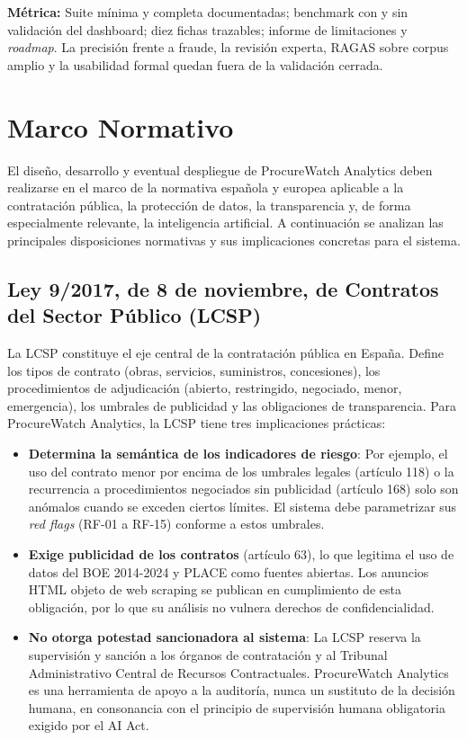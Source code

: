\documentclass[11pt,a4paper,spanish]{book}
\numberwithin{equation}{chapter}
\numberwithin{figure}{chapter}
\begin{document}
\textbf{M{\'e}trica:} Suite m{\'i}nima y completa documentadas; benchmark con y sin validaci{\'o}n del dashboard; diez fichas trazables; informe de limitaciones y \textit{roadmap}. La precisi{\'o}n frente a fraude, la revisi{\'o}n experta, RAGAS sobre corpus amplio y la usabilidad formal quedan fuera de la validaci{\'o}n cerrada.

\chapter{Marco Normativo}

El diseño, desarrollo y eventual despliegue de ProcureWatch Analytics deben realizarse en el marco de la normativa española y europea aplicable a la contratación pública, la protección de datos, la transparencia y, de forma especialmente relevante, la inteligencia artificial. A continuación se analizan las principales disposiciones normativas y sus implicaciones concretas para el sistema.

\section{Ley 9/2017, de 8 de noviembre, de Contratos del Sector Público (LCSP)}

La LCSP \cite{LCSP2017} constituye el eje central de la contratación pública en España. Define los tipos de contrato (obras, servicios, suministros, concesiones), los procedimientos de adjudicación (abierto, restringido, negociado, menor, emergencia), los umbrales de publicidad y las obligaciones de transparencia. Para ProcureWatch Analytics, la LCSP tiene tres implicaciones prácticas:

\begin{itemize}
\item \textbf{Determina la semántica de los indicadores de riesgo}: Por ejemplo, el uso del contrato menor por encima de los umbrales legales (artículo 118) o la recurrencia a procedimientos negociados sin publicidad (artículo 168) solo son anómalos cuando se exceden ciertos límites. El sistema debe parametrizar sus \textit{red flags} (RF-01 a RF-15) conforme a estos umbrales.

\item \textbf{Exige publicidad de los contratos} (artículo 63), lo que legitima el uso de datos del BOE 2014-2024 y PLACE como fuentes abiertas. Los anuncios HTML objeto de web scraping se publican en cumplimiento de esta obligación, por lo que su análisis no vulnera derechos de confidencialidad.

\item \textbf{No otorga potestad sancionadora al sistema}: La LCSP reserva la supervisión y sanción a los órganos de contratación y al Tribunal Administrativo Central de Recursos Contractuales. ProcureWatch Analytics es una herramienta de apoyo a la auditoría, nunca un sustituto de la decisión humana, en consonancia con el principio de supervisión humana obligatoria exigido por el AI Act.
\end{itemize}
\end{document}
